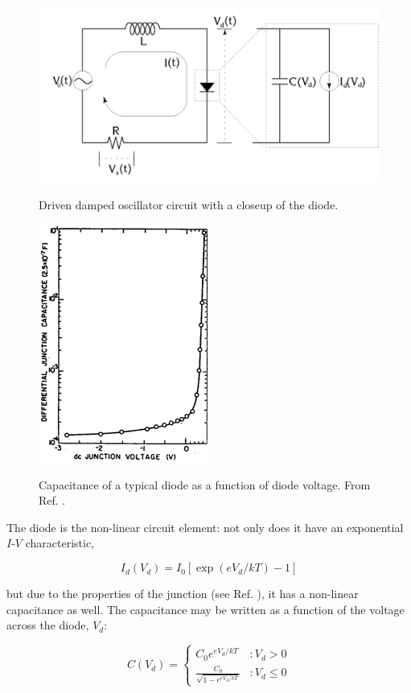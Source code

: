 \documentclass{../lab}
\begin{document}
\begin{figure}[h]
    \centering
    \href{http://experimentationlab.berkeley.edu/sites/default/files/images/Nldimage004.gif}{\includegraphics[width=0.5\linewidth]{images/Nldimage004.png}}
    \caption{Driven damped oscillator circuit with a closeup of the diode.}
    \label{fig:Circuit}
\end{figure}

\begin{figure}[h]
    \centering
    \href{http://experimentationlab.berkeley.edu/sites/default/files/images/Nldimage005.gif}{\includegraphics[width=0.4\linewidth]{images/Nldimage005.png}}
    \caption{Capacitance of a typical diode as a function of diode voltage. From Ref. \cite{Hao}.}
    \label{fig:CapacitanceOfTypicalDiode}
\end{figure}

The diode is the non-linear circuit element: not only does it have an exponential $I$-$V$ characteristic,

\begin{equation}
    I_d(V_d) = I_0[\exp(eV_d / kT) - 1]
\end{equation}

but due to the properties of the junction (see Ref. \cite{Cvitanovic}), it has a non-linear capacitance as well. The capacitance may be written as a function of the voltage across the diode, \emph{$V_{d}$}:

\begin{equation}
    C(V_d) =
    \begin{cases}
        C_0 e^{eV_d/kT} &: V_d > 0 \\
        \frac{C_0}{\sqrt {1-e^{eV_d/kT}}} &: V_d \le 0
    \end{cases}
\end{equation}
 
\end{document}
